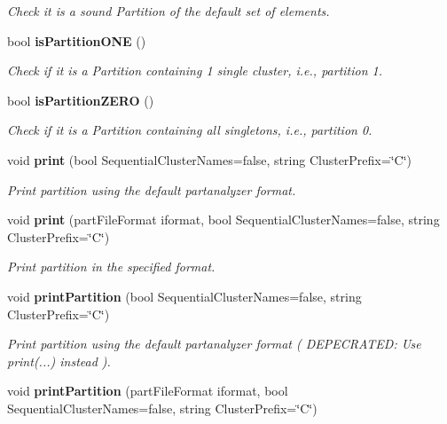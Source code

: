 \begin{CompactItemize}
\begin{CompactList}\small\item\em Check it is a sound Partition of the default set of elements. \item\end{CompactList}\item 
bool {\bf is\-Partition\-ONE} ()\label{classPartition_a13}

\begin{CompactList}\small\item\em Check if it is a Partition containing 1 single cluster, i.e., partition 1. \item\end{CompactList}\item 
bool {\bf is\-Partition\-ZERO} ()\label{classPartition_a14}

\begin{CompactList}\small\item\em Check if it is a Partition containing all singletons, i.e., partition 0. \item\end{CompactList}\item 
void {\bf print} (bool Sequential\-Cluster\-Names=false, string Cluster\-Prefix=\char`\"{}C\char`\"{})\label{classPartition_a15}

\begin{CompactList}\small\item\em Print partition using the default partanalyzer format. \item\end{CompactList}\item 
void {\bf print} (part\-File\-Format iformat, bool Sequential\-Cluster\-Names=false, string Cluster\-Prefix=\char`\"{}C\char`\"{})\label{classPartition_a16}

\begin{CompactList}\small\item\em Print partition in the specified format. \item\end{CompactList}\item 
void {\bf print\-Partition} (bool Sequential\-Cluster\-Names=false, string Cluster\-Prefix=\char`\"{}C\char`\"{})\label{classPartition_a17}

\begin{CompactList}\small\item\em Print partition using the default partanalyzer format ( DEPECRATED: Use print(...) instead ). \item\end{CompactList}\item 
void {\bf print\-Partition} (part\-File\-Format iformat, bool Sequential\-Cluster\-Names=false, string Cluster\-Prefix=\char`\"{}C\char`\"{})\label{classPartition_a18}


\end{CompactItemize}
